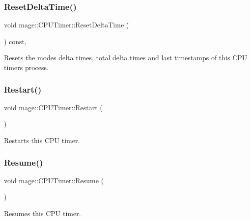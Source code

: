 \subsubsection{\texorpdfstring{Reset\+Delta\+Time()}{ResetDeltaTime()}}
{\footnotesize\ttfamily void mage\+::\+C\+P\+U\+Timer\+::\+Reset\+Delta\+Time (\begin{DoxyParamCaption}{ }\end{DoxyParamCaption}) const\hspace{0.3cm}{\ttfamily [private]}, {\ttfamily [noexcept]}}

Resets the modes\textquotesingle{} delta times, total delta times and last timestamps of this C\+PU timer\textquotesingle{}s process. \hypertarget{classmage_1_1_c_p_u_timer_aad56acfa4f2990d6894d75721ba16f15}{}\label{classmage_1_1_c_p_u_timer_aad56acfa4f2990d6894d75721ba16f15} 
\subsubsection{\texorpdfstring{Restart()}{Restart()}}
{\footnotesize\ttfamily void mage\+::\+C\+P\+U\+Timer\+::\+Restart (\begin{DoxyParamCaption}{ }\end{DoxyParamCaption})\hspace{0.3cm}{\ttfamily [noexcept]}}

Restarts this C\+PU timer. \hypertarget{classmage_1_1_c_p_u_timer_a8285a7306896f52adb093284d6c9da4d}{}\label{classmage_1_1_c_p_u_timer_a8285a7306896f52adb093284d6c9da4d} 
\subsubsection{\texorpdfstring{Resume()}{Resume()}}
{\footnotesize\ttfamily void mage\+::\+C\+P\+U\+Timer\+::\+Resume (\begin{DoxyParamCaption}{ }\end{DoxyParamCaption})\hspace{0.3cm}{\ttfamily [noexcept]}}

Resumes this C\+PU timer. \hypertarget{classmage_1_1_c_p_u_timer_abcb6e468bad9fb821c18502b6445b696}{}\label{classmage_1_1_c_p_u_timer_abcb6e468bad9fb821c18502b6445b696} 

